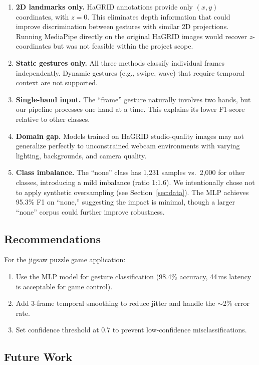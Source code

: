 \documentclass[11pt,a4paper]{article}
\begin{document}
\begin{enumerate}
    \item \textbf{2D landmarks only.} HaGRID annotations provide only $(x, y)$ coordinates, with $z = 0$. This eliminates depth information that could improve discrimination between gestures with similar 2D projections. Running MediaPipe directly on the original HaGRID images would recover $z$-coordinates but was not feasible within the project scope.
    \item \textbf{Static gestures only.} All three methods classify individual frames independently. Dynamic gestures (e.g., swipe, wave) that require temporal context are not supported.
    \item \textbf{Single-hand input.} The ``frame'' gesture naturally involves two hands, but our pipeline processes one hand at a time. This explains its lower F1-score relative to other classes.
    \item \textbf{Domain gap.} Models trained on HaGRID studio-quality images may not generalize perfectly to unconstrained webcam environments with varying lighting, backgrounds, and camera quality.
    \item \textbf{Class imbalance.} The ``none'' class has 1,231 samples vs.\ 2,000 for other classes, introducing a mild imbalance (ratio 1:1.6). We intentionally chose not to apply synthetic oversampling (see Section~\ref{sec:data}). The MLP achieves 95.3\% F1 on ``none,'' suggesting the impact is minimal, though a larger ``none'' corpus could further improve robustness.
\end{enumerate}

\subsection{Recommendations}

For the jigsaw puzzle game application:
\begin{enumerate}
    \item Use the MLP model for gesture classification (98.4\% accuracy, 44\,ms latency is acceptable for game control).
    \item Add 3-frame temporal smoothing to reduce jitter and handle the $\sim$2\% error rate.
    \item Set confidence threshold at 0.7 to prevent low-confidence misclassifications.
\end{enumerate}

\subsection{Future Work}
\end{document}
